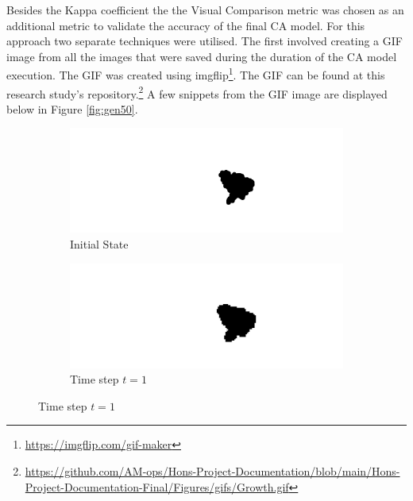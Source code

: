 Besides the Kappa coefficient the the Visual Comparison metric was chosen as an additional metric to validate the accuracy of the final CA model. For this approach two separate techniques were utilised. The first involved creating a GIF image from all the images that were saved during the duration of the CA model execution. The GIF was created using imgflip\footnote{\url{https://imgflip.com/gif-maker}}. The GIF can be found at this research study's repository.\footnote{\url{https://github.com/AM-ops/Hons-Project-Documentation/blob/main/Hons-Project-Documentation-Final/Figures/gifs/Growth.gif}} A few snippets from the GIF image are displayed below in Figure \ref{fig:gen50}.
\begin{figure}[H]
\begin{subfigure}{.5\textwidth}
  \centering
  \includegraphics[width=1\linewidth]{Figures/Chapter4/generation-0-melusi}
  \caption*{Initial State}
\end{subfigure}
\begin{subfigure}{.5\textwidth}
  \centering
  \includegraphics[width=1\linewidth]{Figures/Chapter4/generation-1-melusi}
  \caption*{Time step $t = 1$}
\end{subfigure}
\end{figure}

